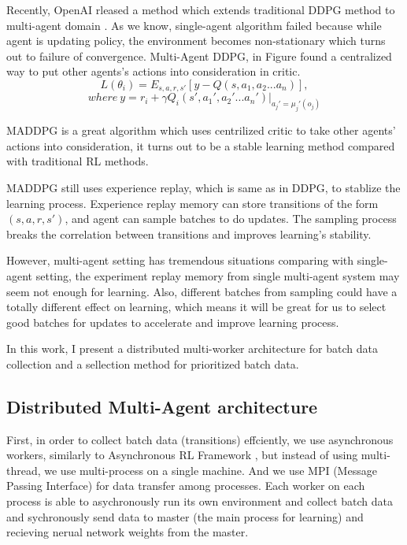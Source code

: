 \documentclass[11pt,twocolumn]{jarticle} %
\begin{document}
Recently, OpenAI rleased a method which extends traditional DDPG method to multi-agent domain \cite{maddpg}. As we know, single-agent algorithm failed because while agent is updating policy, the environment becomes non-stationary which turns out to failure of convergence. Multi-Agent DDPG, in Figure \label{fig:maddpg} found a centralized way to put other agents's actions into consideration in critic.
\begin{equation}
L(\theta_i) = E_{s,a,r,s'}[y - Q(s, a_1, a_2 ... a_n)],  
\end{equation}
$$where\ y = r_i + \gamma{Q_i}(s', a_1', a_2' ... a_n') | _{a_j'=\mu_j'(o_j)}$$

MADDPG is a great algorithm which uses centrilized critic to take other agents' actions into consideration, it turns out to be a stable learning method compared with traditional RL methods. \par

MADDPG still uses experience replay, which is same as in DDPG, to stablize the learning process. Experience replay \cite{replay} memory can store transitions of the form $(s,a,r,s')$, and agent can sample batches to do updates. The sampling process breaks the correlation between transitions and improves learning's stability. \par

However, multi-agent setting has tremendous situations comparing with single-agent setting, the experiment replay memory from single multi-agent system may seem not enough for learning. Also, different batches from sampling could have a totally different effect on learning, which means it will be great for us to select good batches for updates to accelerate and improve learning process. \par

In this work, I present a distributed multi-worker architecture for batch data collection and a sellection method for prioritized batch data.


\subsection{Distributed Multi-Agent architecture}

First, in order to collect batch data (transitions) effciently, we use asynchronous workers, similarly to Asynchronous RL Framework \cite{a3c}, but instead of using multi-thread, we use multi-process on a single machine. And we use MPI (Message Passing Interface) for data transfer among processes. Each worker on each process is able to asychronously run its own environment and collect batch data and sychronously send data to master (the main process for learning) and recieving nerual network weights from the master. \par
\end{document}
